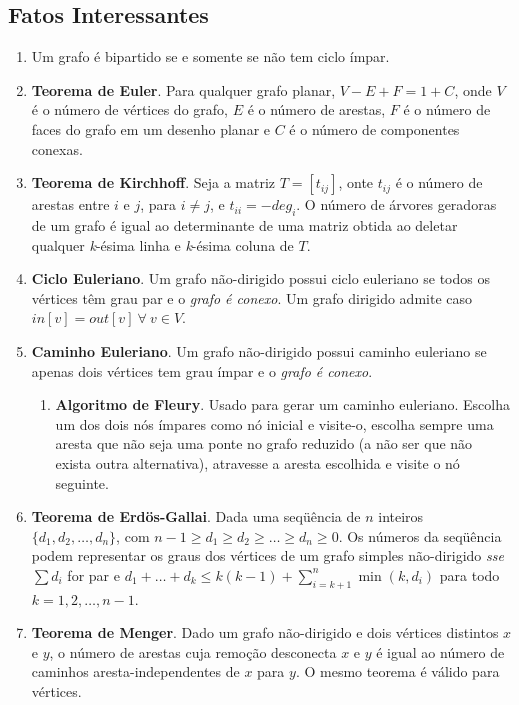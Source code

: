 \documentclass[12pt,a4paper]{article}
\begin{document}
		\subsection{Fatos Interessantes}
			\begin{enumerate}
				\item Um grafo é bipartido se e somente se não tem ciclo ímpar.
				\item \textbf{Teorema de Euler}. Para qualquer grafo planar, \( V - E + F = 1 + C \), onde \(V\) é o número de vértices do grafo, \(E\) é o número de arestas, \(F\) é o número de faces do grafo em um desenho planar e \(C\) é o número de componentes conexas.
				\item \textbf{Teorema de Kirchhoff}. Seja a matriz \( T = [ t_{ij} ] \), onte \( t_{ij} \) é o número de arestas entre \(i\) e \(j\), para \( i \neq j \), e \( t_{ii} = - deg_i \). O número de árvores geradoras de um grafo é igual ao determinante de uma matriz obtida ao deletar qualquer \emph{k}-ésima linha e \emph{k}-ésima coluna de \(T\).
				\item \textbf{Ciclo Euleriano}. Um grafo não-dirigido possui ciclo euleriano se todos os vértices têm grau par e o \emph{grafo é conexo}. Um grafo dirigido admite caso $in[v] = out[v] ~ \forall ~ v \in V$.
				\item \textbf{Caminho Euleriano}. Um grafo não-dirigido possui caminho euleriano se apenas dois vértices tem grau ímpar e o \emph{grafo é conexo}.
				\begin{enumerate}
					\item \textbf{Algoritmo de Fleury}. Usado para gerar um caminho euleriano. Escolha um dos dois nós ímpares como nó inicial e visite-o, escolha sempre uma aresta que não seja uma ponte no grafo reduzido (a não ser que não exista outra alternativa), atravesse a aresta escolhida e visite o nó seguinte.
				\end{enumerate}
				\item \textbf{Teorema de Erdös-Gallai}. Dada uma seqüência de $n$ inteiros $\{d_1, d_2, \ldots, d_n\}$, com $n-1 \geq d_1 \geq d_2 \geq \ldots \geq d_n \geq 0$. Os números da seqüência podem representar os graus dos vértices de um grafo simples não-dirigido \emph{sse} $\sum d_i$ for par e $d_1 + \ldots + d_k \leq k (k - 1) + \sum_{i=k+1}^n \min(k, d_i)$ para todo $k = 1, 2, \ldots, n - 1$.
				\item \textbf{Teorema de Menger}. Dado um grafo não-dirigido e dois vértices distintos $x$ e $y$, o número de arestas cuja remoção desconecta $x$ e $y$ é igual ao número de caminhos aresta-independentes de $x$ para $y$. O mesmo teorema é válido para vértices.
			\end{enumerate}
\end{document}
